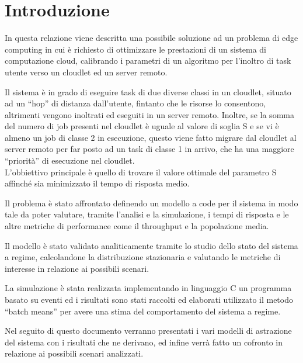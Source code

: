 \section{Introduzione}
In questa relazione viene descritta una possibile soluzione ad un problema di
edge computing in cui è richiesto di ottimizzare le prestazioni di un sistema di
computazione cloud, calibrando i parametri di un algoritmo per l'inoltro di task
utente verso un cloudlet ed un server remoto.

Il sistema è in grado di eseguire task di due diverse classi in un cloudlet,
situato ad un ``hop'' di distanza dall'utente, fintanto che le risorse lo
consentono, altrimenti vengono inoltrati ed eseguiti in un server remoto.
Inoltre, se la somma del numero di job presenti nel cloudlet è uguale al valore
di soglia S e se vi è almeno un job di classe 2 in esecuzione, questo viene
fatto migrare dal cloudlet al server remoto per far posto ad un task di classe 1
in arrivo, che ha una maggiore ``priorità'' di esecuzione nel cloudlet.\\
L'obbiettivo principale è quello di trovare il valore ottimale del parametro S
affinché sia minimizzato il tempo di risposta medio.

Il problema è stato affrontato definendo un modello a code per il sistema in
modo tale da poter valutare, tramite l'analisi e la simulazione, i tempi di
risposta e le altre metriche di performance come il throughput e la popolazione
media. 

Il modello è stato validato analiticamente tramite lo studio dello stato del
sistema a regime, calcolandone la distribuzione stazionaria e valutando le
metriche di interesse in relazione ai possibili scenari.

La simulazione è stata realizzata implementando in linguaggio C un programma
basato su eventi ed i risultati sono stati raccolti ed elaborati utilizzato il
metodo ``batch means'' per avere una stima del comportamento del sistema a
regime.

Nel seguito di questo documento verranno presentati i vari modelli di
astrazione del sistema con i risultati che ne derivano, ed infine verrà fatto un
cofronto in relazione ai possibili scenari analizzati.

